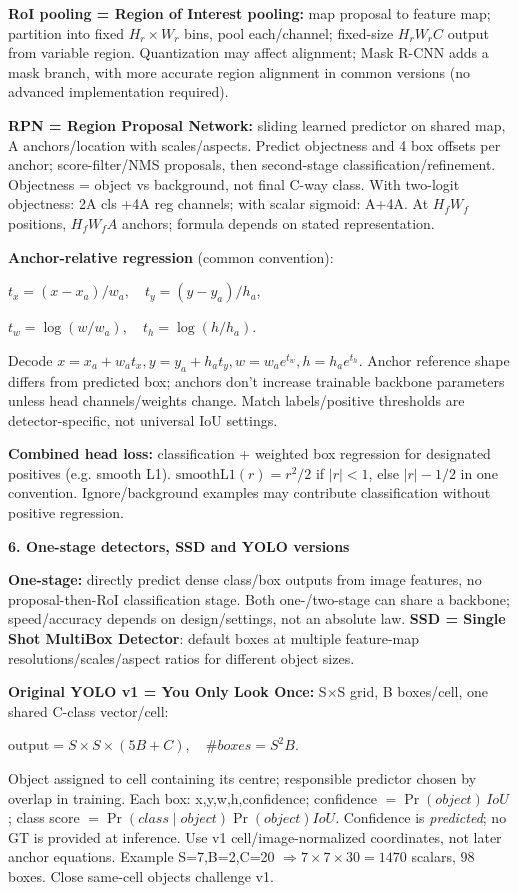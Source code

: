 \documentclass[a4paper]{article}
\newcommand{\key}[1]{\textbf{#1}}
\newcommand{\Topic}[1]{\par\vspace{1.7pt}\noindent
  {\fontsize{7.7}{8.0}\selectfont\bfseries #1}\par\vspace{0.3pt}}
\newcommand{\eq}[1]{\par\noindent\mbox{\(\displaystyle #1\)}\par}
\newcounter{sheet}
\newcounter{sheetcolumn}
\newlength{\colwidth}
\newenvironment{sheetcol}[1][7.0]{\stepcounter{sheetcolumn}
  \begin{lrbox}{\columnbox}\begin{minipage}[t]{\colwidth}\vspace{0pt}
  \fontsize{#1}{\dimexpr#1pt+0.6pt\relax}\selectfont}
  {\end{minipage}\end{lrbox}
  \typeout{CV1COL|\thesheet|\thesheetcolumn|\the\dimexpr\ht\columnbox+\dp\columnbox\relax}
  \usebox{\columnbox}\ignorespacesafterend}
\begin{document}
\begin{sheetcol}[6.7]
\key{RoI pooling = Region of Interest pooling:} map proposal to feature map; partition into fixed \(H_r\!\times\!W_r\) bins, pool each/channel; fixed-size \(H_rW_rC\) output from variable region. Quantization may affect alignment; Mask R-CNN adds a mask branch, with more accurate region alignment in common versions (no advanced implementation required).

\key{RPN = Region Proposal Network:} sliding learned predictor on shared map, A anchors/location with scales/aspects. Predict objectness and 4 box offsets per anchor; score-filter/NMS proposals, then second-stage classification/refinement. Objectness = object vs background, not final C-way class. With two-logit objectness: 2A cls +4A reg channels; with scalar sigmoid: A+4A. At \(H_fW_f\) positions, \(H_fW_fA\) anchors; formula depends on stated representation.

\key{Anchor-relative regression} (common convention):
\eq{t_x=(x-x_a)/w_a,\quad t_y=(y-y_a)/h_a,}
\eq{t_w=\log(w/w_a),\quad t_h=\log(h/h_a).}
Decode \(x=x_a+w_at_x,y=y_a+h_at_y,w=w_ae^{t_w},h=h_ae^{t_h}\). Anchor reference shape differs from predicted box; anchors don't increase trainable backbone parameters unless head channels/weights change. Match labels/positive thresholds are detector-specific, not universal IoU settings.

\key{Combined head loss:} classification + weighted box regression for designated positives (e.g. smooth L1). \(\mathrm{smoothL1}(r)=r^2/2\) if \(|r|<1\), else \(|r|-1/2\) in one convention. Ignore/background examples may contribute classification without positive regression.

\Topic{6. One-stage detectors, SSD and YOLO versions}
\key{One-stage:} directly predict dense class/box outputs from image features, no proposal-then-RoI classification stage. Both one-/two-stage can share a backbone; speed/accuracy depends on design/settings, not an absolute law. \key{SSD = Single Shot MultiBox Detector}: default boxes at multiple feature-map resolutions/scales/aspect ratios for different object sizes.

\key{Original YOLO v1 = You Only Look Once:} S\(\times\)S grid, B boxes/cell, one shared C-class vector/cell:
\eq{\text{output}=S\times S\times(5B+C),\quad
 \#boxes=S^2B.}
Object assigned to cell containing its centre; responsible predictor chosen by overlap in training. Each box: x,y,w,h,confidence; confidence \(=\Pr(object)\,IoU\); class score \(=\Pr(class\mid object)\Pr(object)IoU\). Confidence is \emph{predicted}; no GT is provided at inference. Use v1 cell/image-normalized coordinates, not later anchor equations. Example S=7,B=2,C=20 \(\Rightarrow7\!\times\!7\!\times\!30=1470\) scalars, 98 boxes. Close same-cell objects challenge v1.


\end{sheetcol}
\end{document}
